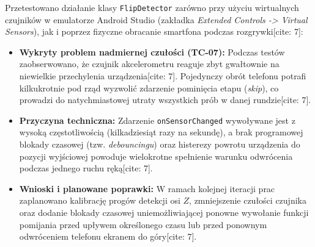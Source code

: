 \hspace{0.60cm}Przetestowano działanie klasy \texttt{FlipDetector} zarówno przy użyciu wirtualnych czujników w emulatorze Android Studio (zakładka \textit{Extended Controls -> Virtual Sensors}), jak i poprzez fizyczne obracanie smartfona podczas rozgrywki[cite: 7]:
\begin{itemize}
    \item \textbf{Wykryty problem nadmiernej czułości (TC-07):} Podczas testów zaobserwowano, że czujnik akcelerometru reaguje zbyt gwałtownie na niewielkie przechylenia urządzenia[cite: 7]. Pojedynczy obrót telefonu potrafi kilkukrotnie pod rząd wyzwolić zdarzenie pominięcia etapu (\textit{skip}), co prowadzi do natychmiastowej utraty wszystkich prób w danej rundzie[cite: 7].
    \item \textbf{Przyczyna techniczna:} Zdarzenie \texttt{onSensorChanged} wywoływane jest z wysoką częstotliwością (kilkadziesiąt razy na sekundę), a brak programowej blokady czasowej (tzw. \textit{debouncingu}) oraz histerezy powrotu urządzenia do pozycji wyjściowej powoduje wielokrotne spełnienie warunku odwrócenia podczas jednego ruchu ręką[cite: 7].
    \item \textbf{Wnioski i planowane poprawki:} W ramach kolejnej iteracji prac zaplanowano kalibrację progów detekcji osi $Z$, zmniejszenie czułości czujnika oraz dodanie blokady czasowej uniemożliwiającej ponowne wywołanie funkcji pomijania przed upływem określonego czasu lub przed ponownym odwróceniem telefonu ekranem do góry[cite: 7].
\end{itemize}